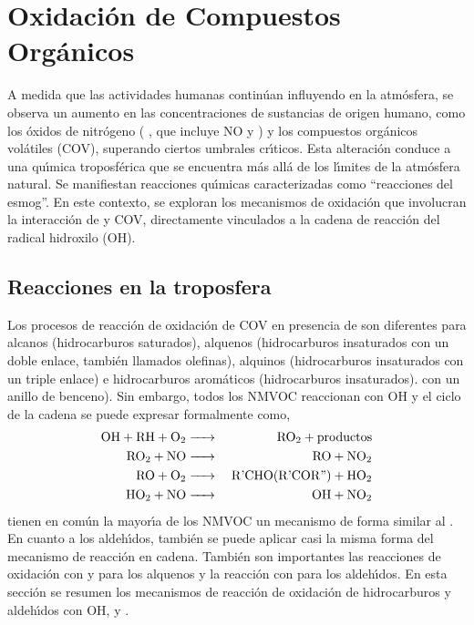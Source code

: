 \section{Oxidaci\'on de Compuestos Org\'anicos}
A medida que las actividades humanas contin\'uan influyendo en la atm\'osfera, se observa un aumento en las concentraciones de sustancias de origen humano, como los \'oxidos de nitr\'ogeno ( , que incluye NO y  ) y los compuestos org\'anicos vol\'atiles (COV), superando ciertos umbrales cr\'{\i}ticos. Esta alteraci\'on conduce a una qu\'{\i}mica troposf\'erica que se encuentra m\'as all\'a de los l\'{\i}mites de la atm\'osfera natural. Se manifiestan reacciones qu\'{\i}micas caracterizadas como ``reacciones del esmog''. En este contexto, se exploran los mecanismos de oxidaci\'on que involucran la interacci\'on de   y COV, directamente vinculados a la cadena de reacci\'on del radical hidroxilo (OH).

\subsection{Reacciones en la troposfera}
Los procesos de reacci\'on de oxidaci\'on de COV en presencia de   son diferentes para alcanos (hidrocarburos saturados), alquenos (hidrocarburos insaturados con un doble enlace, tambi\'en llamados olefinas), alquinos (hidrocarburos insaturados con un triple enlace) e hidrocarburos arom\'aticos (hidrocarburos insaturados). con un anillo de benceno). Sin embargo, todos los \gls{NMVOC} reaccionan con OH y el ciclo de la cadena   se puede expresar formalmente como,
\begin{eqnarray*}
\ce{OH + RH + O2& -> & RO2 + productos \\
RO2 + NO & -> & RO + NO2\\
RO + O2 & -> & R\textrm{'}CHO(R\textrm{'}COR\textrm{''}) + HO2 \\
HO2 + NO & -> & OH + NO2}
\end{eqnarray*}
tienen en com\'un la mayor\'{\i}a de los \gls{NMVOC} un mecanismo de forma similar al . En cuanto a los aldeh\'{\i}dos, tambi\'en se puede aplicar casi la misma forma del mecanismo de reacci\'on en cadena. Tambi\'en son importantes las reacciones de oxidaci\'on con  y  para los alquenos y la reacci\'on con   para los aldeh\'{\i}dos. En esta secci\'on se resumen los mecanismos de reacci\'on de oxidaci\'on de hidrocarburos y aldeh\'{\i}dos con OH,  y .

